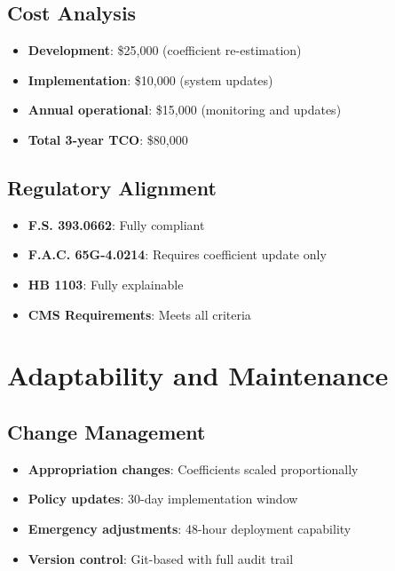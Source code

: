 \subsection{Cost Analysis}

\begin{itemize}
    \item \textbf{Development}: \$25,000 (coefficient re-estimation)
    \item \textbf{Implementation}: \$10,000 (system updates)
    \item \textbf{Annual operational}: \$15,000 (monitoring and updates)
    \item \textbf{Total 3-year TCO}: \$80,000
\end{itemize}

\subsection{Regulatory Alignment}

\begin{itemize}
    \item \textbf{F.S. 393.0662}:  Fully compliant
    \item \textbf{F.A.C. 65G-4.0214}:  Requires coefficient update only
    \item \textbf{HB 1103}: Fully explainable
    \item \textbf{CMS Requirements}:  Meets all criteria
\end{itemize}

\section{Adaptability and Maintenance}

\subsection{Change Management}

\begin{itemize}
    \item \textbf{Appropriation changes}: Coefficients scaled proportionally
    \item \textbf{Policy updates}: 30-day implementation window
    \item \textbf{Emergency adjustments}: 48-hour deployment capability
    \item \textbf{Version control}: Git-based with full audit trail
\end{itemize}

